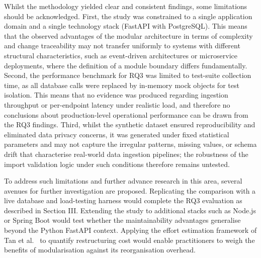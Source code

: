 ﻿\documentclass[conference]{IEEEtran}
\begin{document}
Whilst the methodology yielded clear and consistent findings, some limitations should be acknowledged. First, the study was constrained to a single application domain and a single technology stack (FastAPI with PostgreSQL). This means that the observed advantages of the modular architecture in terms of complexity and change traceability may not transfer uniformly to systems with different structural characteristics, such as event-driven architectures or microservice deployments, where the definition of a module boundary differs fundamentally. Second, the performance benchmark for RQ3 was limited to test-suite collection time, as all database calls were replaced by in-memory mock objects for test isolation. This means that no evidence was produced regarding ingestion throughput or per-endpoint latency under realistic load, and therefore no conclusions about production-level operational performance can be drawn from the RQ3 findings. Third, whilst the synthetic dataset ensured reproducibility and eliminated data privacy concerns, it was generated under fixed statistical parameters and may not capture the irregular patterns, missing values, or schema drift that characterise real-world data ingestion pipelines; the robustness of the import validation logic under such conditions therefore remains untested.

To address such limitations and further advance research in this area, several avenues for further investigation are proposed. Replicating the comparison with a live database and load-testing harness would complete the RQ3 evaluation as described in Section III. Extending the study to additional stacks such as Node.js or Spring Boot would test whether the maintainability advantages generalise beyond the Python FastAPI context. Applying the effort estimation framework of Tan et al.\ \cite{b2} to quantify restructuring cost would enable practitioners to weigh the benefits of modularisation against its reorganisation overhead.
\end{document}
